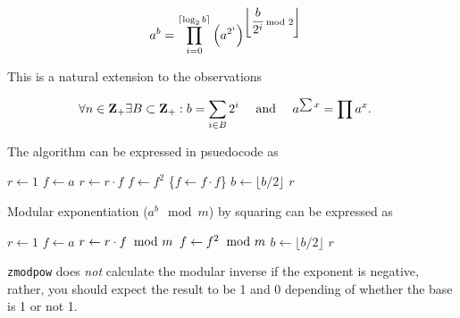 \vspace{-1em}
\[ \hspace*{-0.4cm}
    a^b = \prod_{i = 0}^{\lceil \log_2 b \rceil}
    \left ( a^{2^i} \right )^{\left \lfloor {\displaystyle{b \over 2^i}} \hspace*{-1ex} \mod 2 \right \rfloor}
\]

\noindent
This is a natural extension to the observations

\vspace{-1em}
\[ \hspace*{-0.4cm}
    \forall n \in \textbf{Z}_{+} \exists B \subset \textbf{Z}_{+} : b = \sum_{i \in B} 2^i
    ~~~~ \textrm{and} ~~~~
    a^{\sum x} = \prod a^x.
\]

\noindent
The algorithm can be expressed in psuedocode as

\vspace{1em}
\hspace{-2.8ex}
\begin{minipage}{\linewidth}
\begin{algorithmic}
    \STATE $r \gets 1$
    \STATE $f \gets a$
        \STATE $r \gets r \cdot f$
      \ENDIF
      \STATE $f \gets f^2$ \qquad \textcolor{c}{\{$f \gets f \cdot f$\}}
      \STATE $b \gets \lfloor b / 2 \rfloor$
    \ENDWHILE
    \RETURN $r$ 
\end{algorithmic}
\end{minipage}
\vspace{1em}

\noindent
Modular exponentiation ($a^b \mod m$) by squaring can be
expressed as

\vspace{1em}
\hspace{-2.8ex}
\begin{minipage}{\linewidth}
\begin{algorithmic}
    \STATE $r \gets 1$
    \STATE $f \gets a$
        \STATE $r \gets r \cdot f \hspace*{-1ex}~ \mod m$
      \ENDIF
      \STATE $f \gets f^2 \hspace*{-1ex}~ \mod m$
      \STATE $b \gets \lfloor b / 2 \rfloor$
    \ENDWHILE
    \RETURN $r$ 
\end{algorithmic}
\end{minipage}
\vspace{1em}

{\tt zmodpow} does \emph{not} calculate the
modular inverse if the exponent is negative,
rather, you should expect the result to be
1 and 0 depending of whether the base is 1
or not 1.


